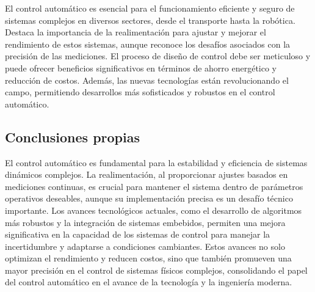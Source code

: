 \documentclass[journal, table]{IEEEtran}
\begin{document}
El control automático es esencial para el funcionamiento eficiente y seguro de
sistemas complejos en diversos sectores, desde el transporte hasta la robótica.
Destaca la importancia de la realimentación para ajustar y mejorar el
rendimiento de estos sistemas, aunque reconoce los desafíos asociados con la
precisión de las mediciones.
El proceso de diseño de control debe ser meticuloso y puede ofrecer beneficios
significativos en términos de ahorro energético y reducción de costos.
Además, las nuevas tecnologías están revolucionando el campo, permitiendo
desarrollos más sofisticados y robustos en el control automático.

\subsection{Conclusiones propias}%
\label{sub:Conclusiones propias}

El control automático es fundamental para la estabilidad y eficiencia de sistemas
dinámicos complejos.
La realimentación, al proporcionar ajustes basados en mediciones continuas,
es crucial para mantener el sistema dentro de parámetros operativos deseables,
aunque su implementación precisa es un desafío técnico importante.
Los avances tecnológicos actuales, como el desarrollo de algoritmos más robustos
y la integración de sistemas embebidos, permiten una mejora significativa en la
capacidad de los sistemas de control para manejar la incertidumbre y adaptarse a
condiciones cambiantes.
Estos avances no solo optimizan el rendimiento y reducen costos, sino que
también promueven una mayor precisión en el control de sistemas físicos
complejos, consolidando el papel del control automático en el avance de la
tecnología y la ingeniería moderna.

\printbibliography
\end{document}
